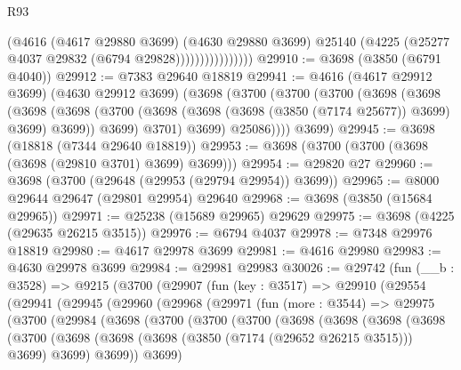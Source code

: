 \begin{lexlean}{R93}
\begin{coremodule}
                            (@4616
                              (@4617 @29880 @3699)
                              (@4630 @29880 @3699)
                              @25140
                              (@4225 (@25277 @4037 @29832 (@6794 @29828))))))))))))))))
@29910 := @3698 (@3850 (@6791 @4040))
@29912 := @7383 @29640 @18819
@29941 := @4616
    (@4617 @29912 @3699)
    (@4630 @29912 @3699)
    (@3698
      (@3700
        (@3700
          (@3700
            (@3698
              (@3698
                (@3698
                  (@3698
                    (@3700 (@3698 (@3698 (@3698 (@3850 (@7174 @25677)) @3699) @3699) @3699))
                    @3699)
                  @3701)
                @3699)
              @25086))))
      @3699)
@29945 := @3698 (@18818 (@7344 @29640 @18819))
@29953 := @3698 (@3700 (@3700 (@3698 (@3698 (@29810 @3701) @3699) @3699)))
@29954 := @29820 @27
@29960 := @3698 (@3700 (@29648 (@29953 (@29794 @29954)) @3699))
@29965 := @8000 @29644 @29647 (@29801 @29954) @29640
@29968 := @3698 (@3850 (@15684 @29965))
@29971 := @25238 (@15689 @29965) @29629
@29975 := @3698 (@4225 (@29635 @26215 @3515))
@29976 := @6794 @4037
@29978 := @7348 @29976 @18819
@29980 := @4617 @29978 @3699
@29981 := @4616 @29980
@29983 := @4630 @29978 @3699
@29984 := @29981 @29983
@30026 := @29742
    (fun (__b : @3528) =>
    @9215
      (@3700
        (@29907
          (fun (key : @3517) =>
          @29910
            (@29554
              (@29941
                (@29945
                  (@29960
                    (@29968
                      (@29971
                        (fun (more : @3544) =>
                        @29975
                          (@3700
                            (@29984
                              (@3698
                                (@3700
                                  (@3700
                                    (@3700
                                      (@3698
                                        (@3698
                                          (@3698
                                            (@3698
                                              (@3700
                                                (@3698
                                                  (@3698
                                                    (@3698
                                                      (@3850 (@7174 (@29652 @26215 @3515)))
                                                      @3699)
                                                    @3699)
                                                  @3699))
                                              @3699)

\end{coremodule}
\end{lexlean}
